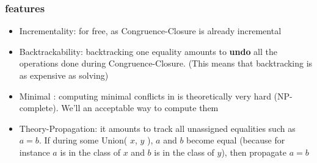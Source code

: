 \begin{frame}
  \frametitle{\tsolver features}

  \begin{itemize}

  \item Incrementality: for free, as Congruence-Closure is already incremental

  \vfill\pause

  \item Backtrackability: backtracking one equality amounts to {\bf undo} 
                          all the operations done during Congruence-Closure.
			  (This means that backtracking is as expensive as
			  solving)

  \vfill\pause

  \item Minimal \tconflicts: computing minimal conflicts in \Uf is theoretically
                             very hard (NP-complete). We'll an acceptable way to
			     compute them

  \vfill\pause

  \item Theory-Propagation: it amounts to track all unassigned equalities such
                            as $a=b$. If during some Union( $x$, $y$ ), $a$ 
			    and $b$ become equal (because for instance 
			    $a$ is in the class of $x$ and $b$ is in the class
			    of $y$), then propagate $a=b$

  \end{itemize}

\end{frame}
